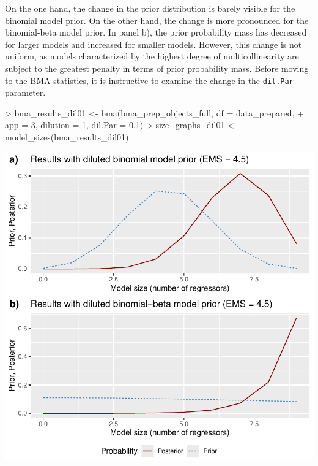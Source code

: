 \documentclass[a4paper]{article}
\begin{document}
On the one hand, the change in the prior distribution is barely visible for the binomial model prior. On the other hand, the change is more pronounced for the binomial-beta model prior. In panel b), the prior probability mass has decreased for larger models and increased for smaller models. However, this change is not uniform, as models characterized by the highest degree of multicollinearity are subject to the greatest penalty in terms of prior probability mass. Before moving to the BMA statistics, it is instructive to examine the change in the \verb+dil.Par+ parameter.
\begin{Schunk}
\begin{Sinput}
> bma_results_dil01 <- bma(bma_prep_objects_full, df = data_prepared,
+                        app = 3, dilution = 1, dil.Par = 0.1)
> size_graphs_dil01 <- model_sizes(bma_results_dil01)
\end{Sinput}
\end{Schunk}
\includegraphics{bdsm_vignette-041}
\end{document}
